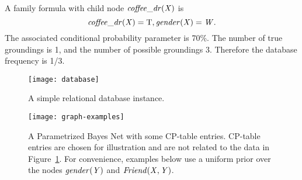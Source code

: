 \documentclass{article}
\begin{document}
%
A family formula with child node $\it{coffee\_{dr}}(X)$ is \[\it{coffee\_{dr}}(X) = \mathrm{T}, \it{gender}(X) = W.\] The associated conditional probability parameter is 70\%.
The number of true groundings is 1, and the number of possible groundings 3. 
Therefore the database frequency  is 1/3.


\begin{figure}[t]
\begin{center}
\texttt{[image: database]}
\caption{A simple relational database instance.
\label{fig:db-tables}}
\end{center}
\end{figure}


\begin{figure}[t]
\begin{center}
\texttt{[image: graph-examples]}
\caption{%
A Parametrized Bayes Net with some CP-table entries.
 CP-table entries are chosen for illustration and are not related to the data in Figure~\ref{fig:db-tables}. 
For convenience, examples below use a uniform prior over the nodes $\it{gender}(Y)$ and $\it{Friend}(X,Y)$.
\label{fig:pbn}}
\end{center}
\end{figure}

\end{document}
